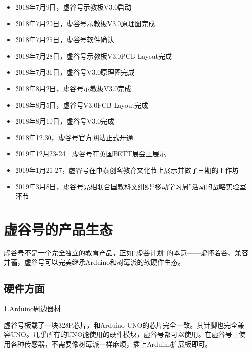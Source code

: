 \documentclass[letterpaper,10pt,english]{sphinxmanual}
\begin{document}
\begin{itemize}
\item {} 
2018年7月9日，虚谷号示教板V3.0启动

\item {} 
2018年7月20日，虚谷号示教板V3.0原理图完成

\item {} 
2018年7月26日，虚谷号软件确认

\item {} 
2018年7月28日，虚谷号示教板V3.0PCB Layout完成

\item {} 
2018年7月31日，虚谷号V3.0原理图完成

\item {} 
2018年8月2日，虚谷号示教板V3.0完成

\item {} 
2018年8月5日，虚谷号V3.0PCB Layout完成

\item {} 
2018年8月10日，虚谷号V3.0完成

\item {} 
2018年12.30，虚谷号官方网站正式开通

\item {} 
2019年12月23-24，虚谷号在英国BETT展会上展示

\item {} 
2019年1月26-27，虚谷号在中泰创客教育文化节上展示并做了三期的工作坊

\item {} 
2019年3月8日，虚谷号亮相联合国教科文组织“移动学习周”活动的战略实验室环节

\end{itemize}


\section{虚谷号的产品生态}
\label{\detokenize{01.about/1.4-ecology::doc}}\label{\detokenize{01.about/1.4-ecology:id1}}
虚谷号不是一个完全独立的教育产品，正如“虚谷计划”的本意——虚怀若谷、兼容并蓄，虚谷号可以完美继承Arduino和树莓派的软硬件生态。


\subsection{硬件方面}
\label{\detokenize{01.about/1.4-ecology:id2}}
1.Arduino周边器材

虚谷号板载了一块328P芯片，和Arduino UNO的芯片完全一致。其针脚也完全兼容UNO。几乎所有的UNO能使用的硬件模块，虚谷号都可以使用。在虚谷号上使用各种传感器，不需要像树莓派一样麻烦，插上Arduino扩展板即可。
\end{document}
